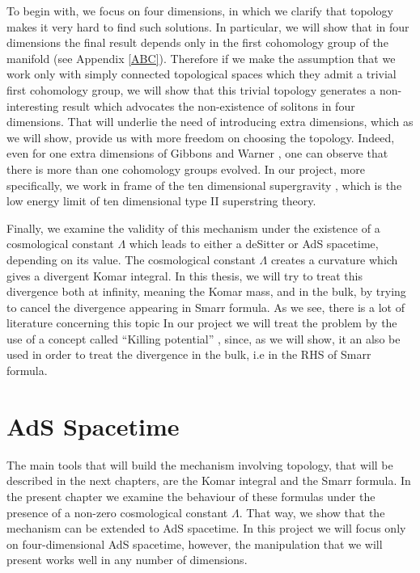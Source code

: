 \documentclass[a4paper,notitlepage]{report}
\begin{document}
To begin with, we focus on  four dimensions, in which we clarify that topology makes it very hard to find such solutions. In particular, we will show that in four dimensions the final result depends only in the first cohomology group of the manifold (see Appendix \ref{ABC}). Therefore if we make the assumption that we work only with simply connected topological spaces which they admit a trivial first cohomology group, we will show that this trivial topology generates a non-interesting result which advocates the non-existence of solitons in four dimensions. That will underlie the need of introducing extra dimensions, which as we will show, provide us with more freedom on choosing the topology. Indeed, even for one extra dimensions of Gibbons and Warner \cite{gibbonsglobal}, one can observe that there is more than one cohomology groups evolved. In our project, more specifically, we work in frame of the ten dimensional supergravity \cite{freedman2012supergravity,nastase2011introduction}, which is the low energy limit of ten dimensional type II superstring theory.

Finally, we examine the validity of this mechanism under the existence of a cosmological constant $\Lambda$ which leads to either a deSitter or AdS spacetime, depending on its value. The cosmological constant $\Lambda$ creates a curvature which gives a divergent Komar integral. In this thesis, we will try to treat this divergence both at infinity, meaning the Komar mass, and in the bulk, by trying to cancel the divergence appearing in Smarr formula. As we see, there is a lot of literature concerning this topic In our project we will treat the problem by the use of a concept called ``Killing potential''  \cite{bazanski1990gauss,kastor2008komar}, since, as we will show, it an also be used in order to treat the divergence in the bulk, i.e in the RHS of Smarr formula.


\chapter{AdS Spacetime}

The main tools that will build the mechanism involving topology, that will be described in the next chapters, are the Komar integral and the Smarr formula. In the present chapter we examine the behaviour of these formulas under the presence of a non-zero cosmological constant $\Lambda$. That way, we show that the mechanism can be extended to AdS spacetime. In this project we will focus only on four-dimensional AdS spacetime, however, the manipulation that we will present works well in any number of dimensions.
\end{document}
